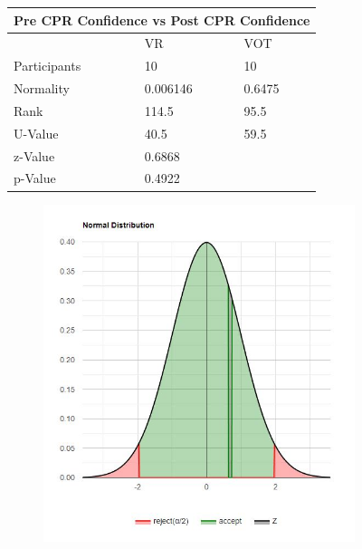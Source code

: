 \documentclass[manuscript]{./Models/acmart}
\begin{document}
\begin{figure}[!t]
    \centering
    \begin{subtable}[b]{.5\textwidth}
        \begin{tabular}{|p{}||p{}|p{}|}
            \hline
            \multicolumn{3}{|c|}{Pre CPR Confidence vs Post CPR Confidence} \\
            \hline\hline
             & VR & VOT \\
            \hline
            Participants & 10 & 10\\
            \hline
            Normality & \cellcolor{red!75}0.006146 & \cellcolor{green!75}0.6475\\
            \hline
            Rank & 114.5 & 95.5\\
            \hline
            U-Value & 40.5 & 59.5\\
            \hline\hline
            z-Value & 0.6868 &\\
            \hline
            p-Value & 0.4922 &\\
            \hline  
        \end{tabular}
        \newline\newline
        \newline\newline
        \caption{Mann-Whitney U statistical analysis of training methods on CPR confidence scores}
        \label{tab:MWTable2}
    \end{subtable}
    \hfill
    \begin{subfigure}[b]{.4\textwidth}
        \centering
        \includegraphics[width=\textwidth]{Photos/Pre CPR confidence VS Post confidence group MWU test.jpg}

\end{subfigure}
\end{figure}
\end{document}
